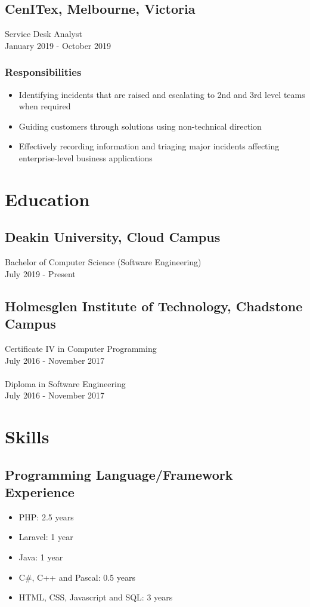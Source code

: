 \documentclass[a4paper, 10pt]{article}
\begin{document}
	\subsection*{CenITex, Melbourne, Victoria}
		Service Desk Analyst\\
		January 2019 - October 2019
	\subsubsection*{Responsibilities}
	\begin{itemize}
		\item Identifying incidents that are raised and escalating to 2nd and 3rd level teams when required
		\item Guiding customers through solutions using non-technical direction
		\item Effectively recording information and triaging major incidents affecting enterprise-level business applications 
	\end{itemize}
	\section*{Education}
	\subsection*{Deakin University, Cloud Campus}
		Bachelor of Computer Science (Software Engineering)\\
		July 2019 - Present
	\subsection*{Holmesglen Institute of Technology, Chadstone Campus}
		Certificate IV in Computer Programming\\
		July 2016 - November 2017\\	
	\\
		Diploma in Software Engineering\\
		July 2016 - November 2017
	\section*{Skills}
	\subsection*{Programming Language/Framework Experience}
	\begin{itemize}
		\item PHP: 2.5 years
		\item Laravel: 1 year
		\item Java: 1 year
		\item C\#, C++ and Pascal: 0.5 years
		\item HTML, CSS, Javascript and SQL: 3 years
	\end{itemize}
\end{document}
